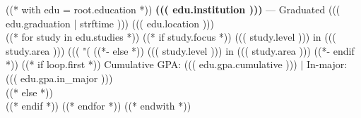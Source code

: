 ((* with edu = root.education *))
\relax
    {\large\textbf{((( edu.institution )))}} --- Graduated ((( edu.graduation | strftime ))) \hfill{\small ((( edu.location )))}\\
    ((* for study in edu.studies *))
            ((* if study.focus *))
    ((( study.level ))) in ((( study.area ))) ((( "(%
            ((*- else *))
    ((( study.level ))) in ((( study.area )))
            ((*- endif *))
            ((* if loop.first *))
 \hfill Cumulative GPA: ((( edu.gpa.cumulative ))) $|$ In-major: ((( edu.gpa.in_major )))\\
            ((* else *))
\\
            ((* endif *))
    ((* endfor *))
((* endwith *))
